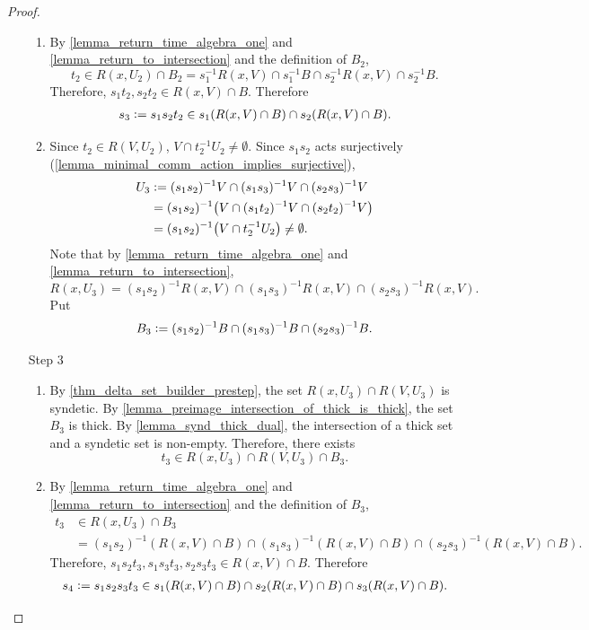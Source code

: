 \begin{proof}
\begin{enumerate}
\begin{enumerate}
            \item By \cref{lemma_return_time_algebra_one} and \cref{lemma_return_to_intersection} and the definition of $B_2$,
            \[t_2 \in R(x,U_2) \cap B_2 = s_1^{-1} R(x,V) \cap s_1^{-1} B \cap s_2^{-1} R(x,V) \cap s_2^{-1} B.\]
            Therefore, $s_1 t_2, s_2 t_2 \in R(x,V) \cap B$.  Therefore
            \begin{align}
                \label{eqn_delta_it_two}
                s_3 \defeq s_1s_2t_2 \in s_1 (R(x,V) \cap B) \cap s_2 (R(x,V) \cap B).
            \end{align}

            \item Since $t_2 \in R(V,U_2)$, $V \cap t_2^{-1} U_2 \neq \emptyset$.  Since $s_1s_2$ acts surjectively (\cref{lemma_minimal_comm_action_implies_surjective}),
            \begin{align*}
                U_3 &\defeq (s_1s_2)^{-1} V \cap (s_1 s_3)^{-1} V \cap (s_2 s_3)^{-1} V \\
                &= (s_1s_2)^{-1} \big( V \cap (s_1 t_2)^{-1} V \cap (s_2 t_2)^{-1} V \big)\\
                &= (s_1s_2)^{-1} \big( V \cap t_2^{-1} U_2\big) \neq \emptyset.
            \end{align*}
            Note that by \cref{lemma_return_time_algebra_one} and \cref{lemma_return_to_intersection},
            \[R(x,U_3) = (s_1s_2)^{-1} R(x,V) \cap (s_1s_3)^{-1} R(x,V) \cap (s_2s_3)^{-1}R(x,V).\]
            Put
            \[B_3 \defeq (s_1s_2)^{-1} B \cap (s_1s_3)^{-1} B \cap (s_2s_3)^{-1} B.\]
        \end{enumerate}

        \item[Step 3]
        \begin{enumerate}
            \item By \cref{thm_delta_set_builder_prestep}, the set $R(x,U_3) \cap R(V,U_3)$ is syndetic.  By \cref{lemma_preimage_intersection_of_thick_is_thick}, the set $B_3$ is thick. By \cref{lemma_synd_thick_dual}, the intersection of a thick set and a syndetic set is non-empty.  Therefore, there exists
            \[t_3 \in R(x,U_3) \cap R(V,U_3) \cap B_3.\]

            \item By \cref{lemma_return_time_algebra_one} and \cref{lemma_return_to_intersection} and the definition of $B_3$,
            \begin{align*}
                t_3 &\in R(x,U_3) \cap B_3 \\
                &= (s_1s_2)^{-1} (R(x,V) \cap B) \cap (s_1s_3)^{-1} (R(x,V) \cap B) \cap (s_2s_3)^{-1}(R(x,V) \cap B).
            \end{align*}
            Therefore, $s_1 s_2 t_3, s_1 s_3 t_3, s_2 s_3 t_3 \in R(x,V) \cap B$.  Therefore
            \begin{align}
                \label{eqn_delta_it_three}
                s_4 \vcentcolon= s_1s_2 s_3t_3  \in s_1 (R(x,V) \cap B) \cap s_2 (R(x,V) \cap B) \cap s_3 (R(x,V) \cap B).
            \end{align}


\end{enumerate}
\end{enumerate}
\end{proof}
